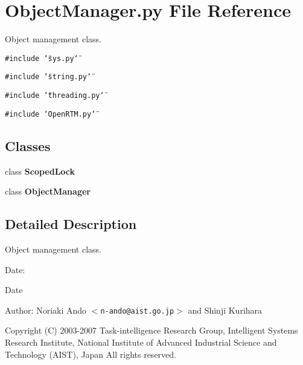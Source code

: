 \section{Object\-Manager.py File Reference}
\label{ObjectManager_8py}
Object management class. 

{\tt \#include \char`\"{}sys.py\char`\"{}}\par
{\tt \#include \char`\"{}string.py\char`\"{}}\par
{\tt \#include \char`\"{}threading.py\char`\"{}}\par
{\tt \#include \char`\"{}Open\-RTM.py\char`\"{}}\par
\subsection*{Classes}
\begin{CompactItemize}
\item 
class {\bf Scoped\-Lock}
\item 
class {\bf Object\-Manager}
\end{CompactItemize}


\subsection{Detailed Description}
Object management class. 

\begin{Desc}
\item[Date:]\begin{Desc}
\item[Date]\end{Desc}
\end{Desc}
\begin{Desc}
\item[Author:]Noriaki Ando $<${\tt n-ando@aist.go.jp}$>$ and Shinji Kurihara\end{Desc}
Copyright (C) 2003-2007 Task-intelligence Research Group, Intelligent Systems Research Institute, National Institute of Advanced Industrial Science and Technology (AIST), Japan All rights reserved.